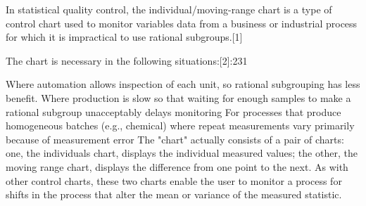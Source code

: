 In statistical quality control, the individual/moving-range chart is a type of control chart used to monitor variables data from a business or industrial process for which it is impractical to use rational subgroups.[1]

The chart is necessary in the following situations:[2]:231

Where automation allows inspection of each unit, so rational subgrouping has less benefit.
Where production is slow so that waiting for enough samples to make a rational subgroup unacceptably delays monitoring
For processes that produce homogeneous batches (e.g., chemical) where repeat measurements vary primarily because of measurement error
The "chart" actually consists of a pair of charts: one, the individuals chart, displays the individual measured values; the other, the moving range chart, displays the difference from one point to the next. As with other control charts, these two charts enable the user to monitor a process for shifts in the process that alter the mean or variance of the measured statistic.
